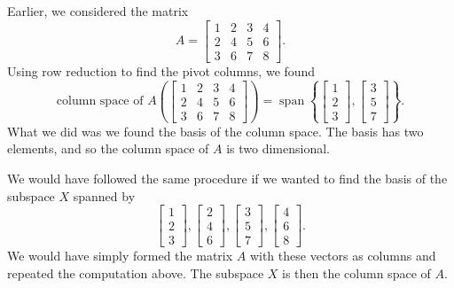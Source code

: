 \documentclass{ximera}
\begin{document}
\begin{example}
    Earlier, we considered the matrix
    \begin{equation*}
        A =
        \begin{bmatrix}
            1 & 2 & 3 & 4 \\
            2 & 4 & 5 & 6 \\
            3 & 6 & 7 & 8
        \end{bmatrix} .
    \end{equation*}
    Using row reduction to find the pivot columns, we found
    \begin{equation*}
        \text{column space of $A$} 
        \left(
            \begin{bmatrix}
                1 & 2 & 3 & 4 \\
                2 & 4 & 5 & 6 \\
                3 & 6 & 7 & 8
            \end{bmatrix} 
        \right)
        = \operatorname{span}
        \left\{
            \begin{bmatrix}
                1 \\
                2 \\
                3 
            \end{bmatrix} 
            ,
            \begin{bmatrix}
                3 \\
                5 \\
                7 
            \end{bmatrix} 
        \right\} .
    \end{equation*}
    What we did was we found the basis of the column space. The basis has two elements, and so the column space of $A$ is two dimensional.
\end{example}

We would have followed the same procedure if we wanted to find the basis of the subspace $X$ spanned by
\begin{equation*}
    \begin{bmatrix}
        1 \\
        2 \\
        3 
    \end{bmatrix} 
    ,
    \begin{bmatrix}
        2 \\
        4 \\
        6 
    \end{bmatrix} 
    ,
    \begin{bmatrix}
        3 \\
        5 \\
        7 
    \end{bmatrix} 
    ,
    \begin{bmatrix}
        4 \\
        6 \\
        8 
    \end{bmatrix}
    .
\end{equation*}
We would have simply formed the matrix $A$ with these vectors as columns and repeated the computation above.  The subspace $X$ is then the column space of $A$.
\end{document}
